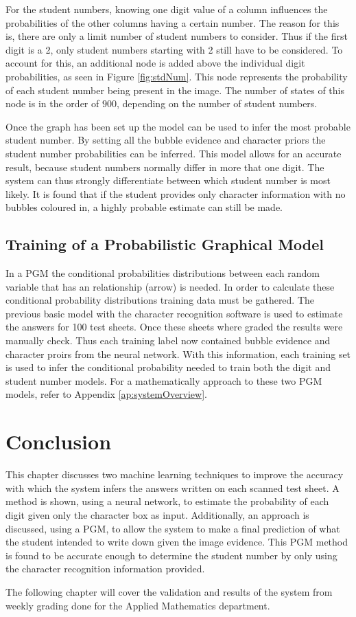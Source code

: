 For the student numbers, knowing one digit value of a column influences the probabilities of the other columns having a certain number. The reason for this is, there are only a limit number of student numbers to consider. Thus if the first digit is a 2, only student numbers starting with 2 still have to be considered. To account for this, an additional node is added above the individual digit probabilities, as seen in Figure \ref{fig:stdNum}. This node represents the probability of each student number being present in the image. The number of states of this node is in the order of $ 900$, depending on the number of student numbers.

Once the graph has been set up the model can be used to infer the most probable student number. By setting all the bubble evidence and character priors the student number probabilities can be inferred. This model allows for an accurate result, because student numbers normally differ in more that one digit. The system can thus strongly differentiate between which student number is most likely. It is found that if the student provides only character information with no bubbles coloured in, a highly probable estimate can still be made.

\subsection{Training of a Probabilistic Graphical Model}
In a PGM the conditional probabilities distributions between each random variable that has an relationship (arrow) is needed. In order to calculate these conditional probability distributions training data must be gathered. The previous basic model with the character recognition software is used to estimate the answers for 100 test sheets. Once these sheets where graded the results were manually check. Thus each training label now contained bubble evidence and character proirs from the neural network. With this information, each training set is used to infer the conditional probability needed to train both the digit and student number models. For a mathematically approach to these two PGM models, refer to Appendix \ref{ap:systemOverview}.

\section{Conclusion}

This chapter discusses two machine learning techniques to improve the accuracy with which the system infers the answers written on each scanned test sheet. A method is shown, using a neural network, to estimate the probability of each digit given only the character box as input. Additionally, an approach is discussed, using a PGM, to allow the system to make a final prediction of what the student intended to write down given the image evidence. This PGM method is found to be accurate enough to determine the student number by only using the character recognition information provided.

The following chapter will cover the validation and results of the system from weekly grading done for the Applied Mathematics department.